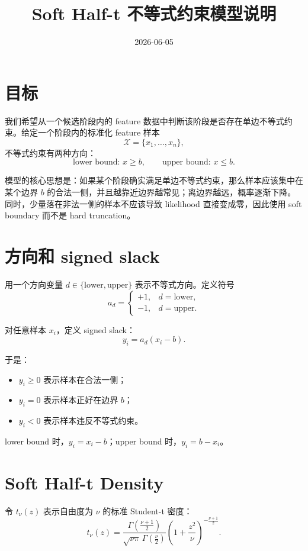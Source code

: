 \documentclass[11pt]{ctexart}
\title{Soft Half-t 不等式约束模型说明}
\author{}
\date{2026-06-05}
\begin{document}
\maketitle

\section{目标}

我们希望从一个候选阶段内的 feature 数据中判断该阶段是否存在单边不等式约束。给定一个阶段内的标准化 feature 样本
\[
\mathcal{X}=\{x_1,\ldots,x_n\},
\]
不等式约束有两种方向：
\[
\text{lower bound: } x\ge b,
\qquad
\text{upper bound: } x\le b.
\]

模型的核心思想是：如果某个阶段确实满足单边不等式约束，那么样本应该集中在某个边界 $b$ 的合法一侧，并且越靠近边界越常见；离边界越远，概率逐渐下降。同时，少量落在非法一侧的样本不应该导致 likelihood 直接变成零，因此使用 soft boundary 而不是 hard truncation。

\section{方向和 signed slack}

用一个方向变量 $d\in\{\mathrm{lower},\mathrm{upper}\}$ 表示不等式方向。定义符号
\[
 a_d=
 \begin{cases}
 +1, & d=\mathrm{lower},\\
 -1, & d=\mathrm{upper}.
 \end{cases}
\]

对任意样本 $x_i$，定义 signed slack：
\[
 y_i = a_d(x_i-b).
\]

于是：
\begin{itemize}[leftmargin=2em]
  \item $y_i\ge 0$ 表示样本在合法一侧；
  \item $y_i=0$ 表示样本正好在边界 $b$；
  \item $y_i<0$ 表示样本违反不等式约束。
\end{itemize}

lower bound 时，$y_i=x_i-b$；upper bound 时，$y_i=b-x_i$。

\section{Soft Half-t Density}

令 $t_\nu(z)$ 表示自由度为 $\nu$ 的标准 Student-t 密度：
\[
 t_\nu(z)
 =
 \frac{\Gamma\left(\frac{\nu+1}{2}\right)}
 {\sqrt{\nu\pi}\,\Gamma\left(\frac{\nu}{2}\right)}
 \left(1+\frac{z^2}{\nu}\right)^{-\frac{\nu+1}{2}}.
\]
\end{document}
